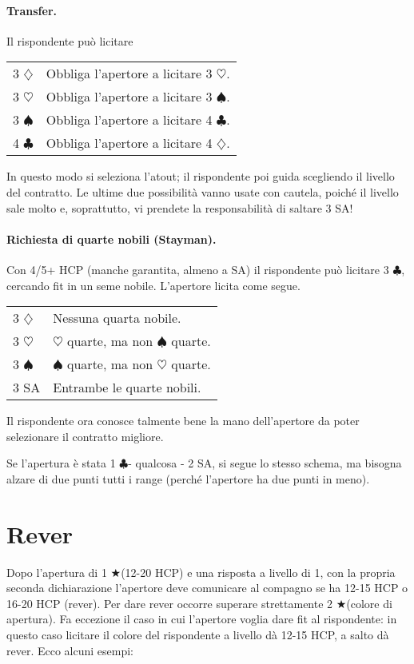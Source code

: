 \documentclass[a4paper,10pt]{article}
\renewcommand{\c}{$\clubsuit$\xspace}
\renewcommand{\d}{$\diamondsuit$\xspace}
\newcommand{\h}{$\heartsuit$\xspace}
\newcommand{\s}{$\spadesuit$\xspace}
\renewcommand{\j}{$\bigstar$\xspace}
\newcommand{\sa}{SA\xspace}
\newcommand{\smallspace}{\vskip0.3cm}
\newenvironment{twocol}
  {\smallspace\noindent\begin{tabular}{l p{0.78\textwidth}}}
  {\end{tabular}\smallspace}
\begin{document}
\paragraph{Transfer.} Il rispondente può licitare

\begin{twocol}
 3 \d & Obbliga l'apertore a licitare 3 \h.\\
 3 \h & Obbliga l'apertore a licitare 3 \s.\\
 3 \s & Obbliga l'apertore a licitare 4 \c.\\
 4 \c & Obbliga l'apertore a licitare 4 \d.\\
\end{twocol}

In questo modo si seleziona l'atout; il rispondente poi guida scegliendo il livello del contratto. Le ultime due possibilità vanno usate con cautela, poiché il livello sale molto e, soprattutto, vi prendete la responsabilità di saltare 3 \sa!

\paragraph{Richiesta di quarte nobili (Stayman).} Con 4/5+ HCP (manche garantita, almeno a \sa) il rispondente può licitare 3 \c, cercando fit in un seme nobile. L'apertore licita come segue.

\begin{twocol}
 3 \d & Nessuna quarta nobile.\\
 3 \h & \h quarte, ma non \s quarte.\\
 3 \s & \s quarte, ma non \h quarte.\\
 3 SA & Entrambe le quarte nobili.
\end{twocol}

Il rispondente ora conosce talmente bene la mano dell'apertore da poter selezionare il contratto migliore.

Se l'apertura è stata 1 \c - qualcosa - 2 \sa, si segue lo stesso schema, ma bisogna alzare di due punti tutti i range (perché l'apertore ha due punti in meno).

\section{Rever}

Dopo l'apertura di 1 \j (12-20 HCP) e una risposta a livello di 1, con la propria seconda dichiarazione l'apertore deve comunicare al compagno se ha 12-15 HCP o 16-20 HCP (rever). Per dare rever occorre superare strettamente 2 \j (colore di apertura). Fa eccezione il caso in cui l'apertore voglia dare fit al rispondente: in questo caso licitare il colore del rispondente a livello dà 12-15 HCP, a salto dà rever. Ecco alcuni esempi:
\end{document}
